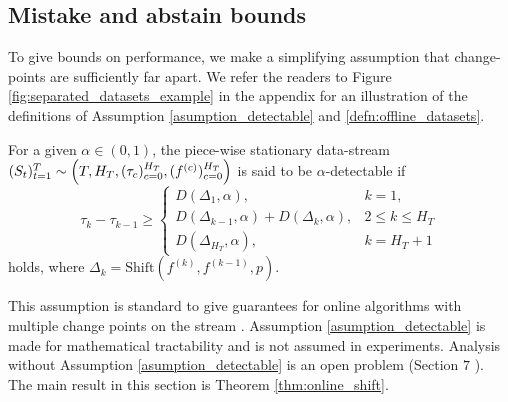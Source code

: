 \subsection{Mistake and abstain bounds}

To give bounds on performance, we make a simplifying assumption that change-points are sufficiently far apart. We refer the readers to Figure \ref{fig:separated_datasets_example} in the appendix for an illustration of the definitions of Assumption \ref{asumption_detectable} and \ref{defn:offline_datasets}.

\begin{assumption}
For a given $\alpha \in (0,1)$, the piece-wise stationary data-stream $(S_t)_{t=1}^T \sim \Bigl(T,H_T, (\tau_c)_{c=0}^{H_T}, (f^{(c)})_{c=0}^{H_T}\Bigr)$ is said to be $\alpha$-detectable if 
% 
\vspace{-0.5em}
\begin{equation*}
    \tau_{k} - \tau_{k-1} \geq \begin{cases}
        D(\Delta_1,\alpha), &k = 1,\\
        D(\Delta_{k-1},\alpha) + D(\Delta_{k},\alpha), &2\leq k\leq H_T\\
        D(\Delta_{H_T}, \alpha), &k=H_T+1
    \end{cases}
\end{equation*}
holds, where $\Delta_{k} = \text{Shift} (f^{(k)},f^{(k-1)},p)$.%
\label{asumption_detectable}
\end{assumption}


 This assumption is standard to give guarantees for online algorithms with multiple change points on the stream \cite{JMLR:v23:20-1384, sankararaman2023online, cao2019nearly, liu2018change}. Assumption \ref{asumption_detectable} is made for mathematical tractability and is not assumed in experiments. Analysis without Assumption \ref{asumption_detectable} is an open problem (Section $7$ \cite{JMLR:v23:20-1384}). The main result in this section is Theorem \ref{thm:online_shift}.

